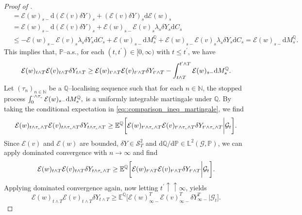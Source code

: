 \documentclass[10pt]{article} %
\newcommand\cE{\mathcal E}
\newcommand\cG{\mathcal G}
\newcommand\cS{\mathcal S}
\newcommand{\smalltext}[1]{\text{\fontsize{4}{4}\selectfont$#1$}}
\def \E{\mathbb{E}}
\def \L{\mathbb{L}}
\def \N{\mathbb{N}}
\def \P{\mathbb{P}}
\def \Q{\mathbb{Q}}
\newcommand{\1}{\mathbf{1}}
\def\d{\mathrm{d}}
\begin{document}
\begin{proof}[Proof of ]
\begin{align*}
		&= \cE(w)_{s-}\d (\cE(v)\delta Y)_s + (\cE(v)\delta Y)_s\d \cE(w)_s \\
		&= \cE(w)_{s-}\d (\cE(v)\delta Y)_s + \cE(w)_{s-}\cE(v)_s \lambda_s \delta Y_s\d C_s \\
		&\leq -\cE(w)_{s-}\cE(v)_s\lambda_s\delta Y_s \d C_s + \cE(w)_{s-}\d M^\Q_s + \cE(w)_{s-}\cE(v)_s \lambda_s \delta Y_s\d C_s = \cE(w)_{s-}\d M^\Q_s.
	\end{align*}
	This implies that, $\P$--a.s., for each $(t,t^\prime) \in [0,\infty)$ with $t \leq t^\prime$, we have
	\begin{equation}\label{eq::comparison_ineq_martingale}
		\cE(w)_{t \land T}\cE(v)_{t \land T}\delta Y_{t \land T} \geq \cE(w)_{t^\smalltext{\prime} \land T}\cE(v)_{t^\smalltext{\prime} \land T}\delta Y_{t^\smalltext{\prime} \land T} - \int_{t \land T}^{t^\smalltext{\prime} \land T}\cE(w)_{s-}\d M^\Q_s.
	\end{equation}
	Let $(\tau_n)_{n \in \N}$ be a $\Q$--localising sequence such that for each $n \in \N$, the stopped process $\int_0^{\cdot \land \tau_\smalltext{n}} \cE(w)_{s-} \d M^\Q_s,$ is a uniformly integrable martingale under $\Q$. By taking the conditional expectation in \eqref{eq::comparison_ineq_martingale}, we find
	\begin{equation}\label{eq::comp_limit_n}
		\cE(w)_{t \land \tau_\smalltext{n} \land T}\cE(v)_{t \land \tau_\smalltext{n} \land T}\delta Y_{t \land \tau_\smalltext{n} \land T} \geq \E^\Q\bigg[ \cE(w)_{t^\smalltext{\prime} \land \tau_\smalltext{n} \land T}\cE(v)_{t^\smalltext{\prime} \land \tau_\smalltext{n} \land T}\delta Y_{t^\smalltext{\prime} \land \tau_\smalltext{n} \land T} \bigg| \cG_t\bigg].
	\end{equation}
	Since $\cE(v)$ and $\cE(w)$ are bounded, $\delta Y \in \cS^2_T$ and $\d\Q/\d\P \in \L^2(\cG,\P)$, we can apply dominated convergence with $n \longrightarrow \infty$ and find
	\begin{equation}\label{eq::comp_limit_t}
		\cE(w)_{t \land T}\cE(v)_{t \land T}\delta Y_{t \land \tau_\smalltext{n} \land T} \geq \E^\Q\bigg[ \cE(w)_{t^\smalltext{\prime} \land T}\cE(v)_{t^\smalltext{\prime} \land T}\delta Y_{t^\smalltext{\prime} \land T} \bigg| \cG_t\bigg].
	\end{equation}
	Applying dominated convergence again, now letting $t^\prime \uparrow\uparrow \infty$, yields
	\begin{equation}\label{eq::comparison_cond_exp}
		\cE(w)_{t \land T}\cE(v)_{t \land T}\delta Y_{t \land T} \geq \E^\Q\bigg[ \cE(w)^T_{\infty-}\cE(v)^T_{\infty-}\delta Y^T_{\infty-} \bigg| \cG_t\bigg].

\end{equation}
\end{proof}
\end{document}
